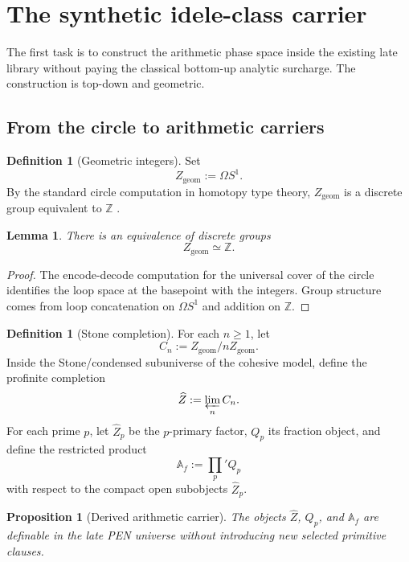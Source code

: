 \documentclass[11pt,a4paper]{article}
\theoremstyle{plain}
\newtheorem{lemma}[theorem]{Lemma}
\newtheorem{proposition}[theorem]{Proposition}
\theoremstyle{definition}
\newtheorem{definition}[theorem]{Definition}
\newcommand{\Z}{\mathbb{Z}}
\newcommand{\Af}{\mathbb{A}_f}
\begin{document}
\section{The synthetic idele-class carrier}
\label{sec:carrier}

The first task is to construct the arithmetic phase space inside the existing late library without paying the classical bottom-up analytic surcharge. The construction is top-down and geometric.

\subsection{From the circle to arithmetic carriers}

\begin{definition}[Geometric integers]
Set
\[
  Z_{\mathrm{geom}}:=\Omega S^1.
\]
By the standard circle computation in homotopy type theory, $Z_{\mathrm{geom}}$ is a discrete group equivalent to $\Z$ \citep{licata-shulman}.
\end{definition}

\begin{lemma}
\label{lem:loopz}
There is an equivalence of discrete groups
\[
  Z_{\mathrm{geom}}\simeq \Z.
\]
\end{lemma}

\begin{proof}
The encode-decode computation for the universal cover of the circle identifies the loop space at the basepoint with the integers. Group structure comes from loop concatenation on $\Omega S^1$ and addition on $\Z$.
\end{proof}

\begin{definition}[Stone completion]
For each $n\ge 1$, let
\[
  C_n:=Z_{\mathrm{geom}}/nZ_{\mathrm{geom}}.
\]
Inside the Stone/condensed subuniverse of the cohesive model, define the profinite completion
\[
  \widehat Z:=\varprojlim_n C_n.
\]
For each prime $p$, let $\widehat Z_p$ be the $p$-primary factor, $Q_p$ its fraction object, and define the restricted product
\[
  \Af:=\prod_{p}' Q_p
\]
with respect to the compact open subobjects $\widehat Z_p$.
\end{definition}

\begin{proposition}[Derived arithmetic carrier]
\label{prop:derived-af}
The objects $\widehat Z$, $Q_p$, and $\Af$ are definable in the late PEN universe without introducing new selected primitive clauses.
\end{proposition}
\end{document}
